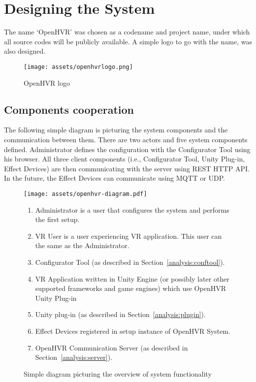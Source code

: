 \chapter{Designing the System}\label{design}

The name `OpenHVR' was chosen as a codename and project name, under which
all source codes will be publicly available. A simple logo to
go with the name, was also designed.

\begin{figure}[h]{}
\centering\texttt{[image: assets/openhvrlogo.png]}
\caption{OpenHVR logo}
\end{figure}

\hypertarget{x-components-cooperation}{\section{Components cooperation}}
The following simple diagram is picturing the system components and the
communication between them. There are two actors and five system
components defined. Administrator defines the configuration with the
Configurator Tool using his browser. All three client components
(i.e., Configurator Tool, Unity Plug-in, Effect Devices) are then communicating
with the server using REST HTTP API. In the future, the Effect Devices
can communicate using MQTT or UDP.


\begin{figure}[h]{}
\centering\texttt{[image: assets/openhvr-diagram.pdf]}
\caption{Simple diagram picturing the overview of system functionality}
\begin{enumerate}
    \item Administrator is a user that configures the system and performs the first setup.
    \item VR User is a user experiencing VR application. This user can the same as the Administrator.
    \item Configurator Tool (as described in Section~\ref{analysis:conftool}).
    \item VR Application written in Unity Engine (or possibly later other supported frameworks and game engines) which use OpenHVR Unity Plug-in
    \item Unity plug-in (as described in Section~\ref{analysis:plugin}).
    \item Effect Devices registered in setup instance of OpenHVR System.
    \item OpenHVR Communication Server (as described in Section~\ref{analysis:server}).
\end{enumerate}
\end{figure}


